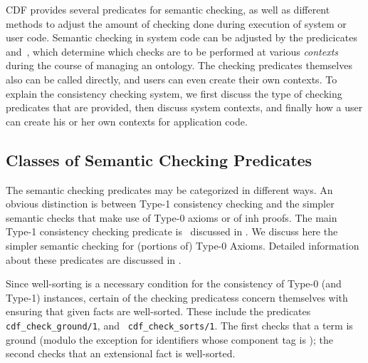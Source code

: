CDF provides several predicates for semantic checking, as well as
different methods to adjust the amount of checking done during
execution of system or user code.  Semantic checking in system code
can be adjusted by the predicicates~
and~, which determine which checks are to
be performed at various {\em contexts} during the course of managing
an ontology.  The checking predicates themselves also can be called
directly, and users can even create their own contexts.  To explain
the consistency checking system, we first discuss the type of checking
predicates that are provided, then discuss system contexts, and
finally how a user can create his or her own contexts for application
code.

\subsection{Classes of Semantic Checking Predicates} \label{sec:checkpreds}

The semantic checking predicates may be categorized in different ways.
An obvious distinction is between Type-1 consistency checking and the
simpler semantic checks that make use of Type-0 axioms or of {\sc inh}
proofs.  The main Type-1 consistency checking predicate
is~ discussed in .
We discuss here the simpler semantic checking for (portions of) Type-0
Axioms.  Detailed information about these predicates are discussed in
.

Since well-sorting is a necessary condition for the consistency of
Type-0 (and Type-1) instances, certain of the checking predicatess
concern themselves with ensuring that given facts are well-sorted.
These include the predicates {\tt cdf\_check\_ground/1}, and {\tt
cdf\_check\_sorts/1}.  The first checks that a term is ground (modulo
the exception for identifiers whose component tag is
); the second checks that an extensional fact is
well-sorted.

